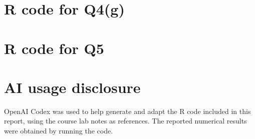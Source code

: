 \documentclass[11pt]{article}
\begin{document}
\clearpage
\section{R code for Q4(g)}



\clearpage
\section{R code for Q5}


\section*{AI usage disclosure}
OpenAI Codex was used to help generate and adapt the R code included
in this report, using the course lab notes as references. The reported
numerical results were obtained by running the code.
\end{document}
